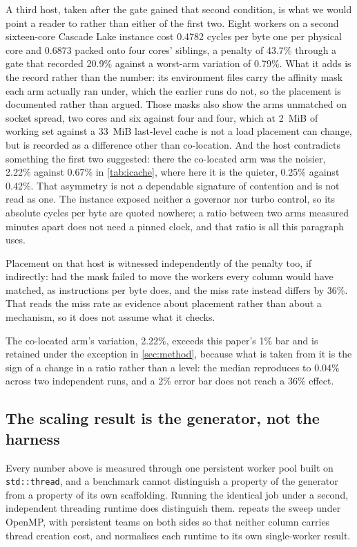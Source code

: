 \documentclass[acmsmall,screen,review]{acmart}
\theoremstyle{acmdefinition}
\newcommand{\code}[1]{\texttt{#1}}
\begin{document}
A third host, taken after the gate gained that second condition, is what we
would point a reader to rather than either of the first two. Eight workers on a
second sixteen-core Cascade Lake instance cost 0.4782 cycles per byte one per
physical core and 0.6873 packed onto four cores' siblings, a penalty of 43.7\%
through a gate that recorded 20.9\% against a worst-arm variation of 0.79\%.
What it adds is the record rather than the number: its environment files carry
the affinity mask each arm actually ran under, which the earlier runs do not, so
the placement is documented rather than argued. Those masks also show the arms
unmatched on socket spread, two cores and six against four and four, which at
2~MiB of working set against a 33~MiB last-level cache is not a load placement
can change, but is recorded as a difference other than co-location. And the host
contradicts something the first two suggested: there the co-located arm was the
noisier, 2.22\% against 0.67\% in \cref{tab:icache}, where here it is the
quieter, 0.25\% against 0.42\%. That asymmetry is not a dependable signature of
contention and is not read as one. The instance exposed neither a governor nor
turbo control, so its absolute cycles per byte are quoted nowhere; a ratio
between two arms measured minutes apart does not need a pinned clock, and that
ratio is all this paragraph uses.

Placement on that host is witnessed independently of the penalty too, if
indirectly: had the mask failed to move the workers every column would have
matched, as instructions per byte does, and the miss rate instead differs by
36\%. That reads the miss rate as evidence about placement rather than about a
mechanism, so it does not assume what it checks.

The co-located arm's variation, 2.22\%, exceeds this paper's 1\% bar and is
retained under the exception in \cref{sec:method}, because what is taken from it
is the sign of a change in a ratio rather than a level: the median reproduces to
0.04\% across two independent runs, and a 2\% error bar does not reach a 36\%
effect.

\subsection{The scaling result is the generator, not the harness}\label{sec:runtime}

Every number above is measured through one persistent worker pool built on
\code{std::thread}, and a benchmark cannot distinguish a property of the
generator from a property of its own scaffolding. Running the identical job
under a second, independent threading runtime does distinguish them.
 repeats the sweep under OpenMP, with persistent teams on
both sides so that neither column carries thread creation cost, and normalises
each runtime to its own single-worker result.
\end{document}
